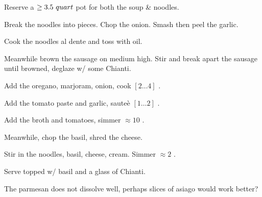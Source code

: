 \begin{preparation}
\item Reserve a $\geq 3.5~quart$ pot for both the soup \& noodles.

\item Break the noodles into pieces.
	Chop the onion.
	Smash then peel the garlic.

\item Cook the noodles al dente and toss with oil.

\item Meanwhile brown the sausage on medium high.
	Stir and break apart the sausage until browned, deglaze w/ some Chianti.

\item Add the oregano, marjoram, onion, cook $[2 \ldots 4]$ \minute.

\item Add the tomato paste and garlic, saute\`{e} $[1 \ldots 2]$ \minute.

\item Add the broth and tomatoes, simmer $\approx 10$ \minute.

\item Meanwhile, chop the basil, shred the cheese.

\item Stir in the noodles, basil, cheese, cream.
	Simmer $\approx 2$ \minute.

\item Serve topped w/ basil and a glass of Chianti.
\end{preparation}


\begin{experiments}
\item The parmesan does not dissolve well, perhaps slices of asiago would work better?
\end{experiments}


\recipeend%
